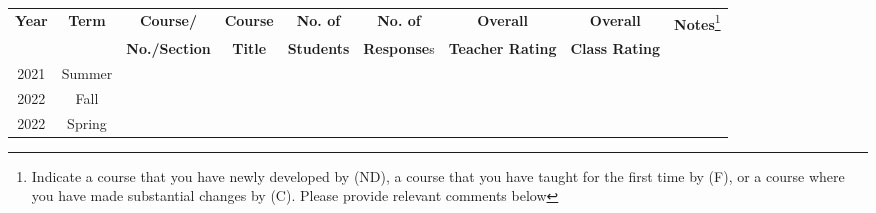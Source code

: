 \documentclass[11pt]{article}
\begin{document}
\begin{minipage}{\textwidth}
  \footnotesize
  \begin{tabular}{ccccccccc}
    \toprule
    \textbf{Year}&\textbf{Term}&\textbf{Course/}&\textbf{Course}&\textbf{No. of}&\textbf{No. of}&\textbf{Overall}&\textbf{Overall}&\textbf{Notes}\footnote{Indicate a course that you have newly developed by (ND), a course that you have taught for the first time by (F), or a course where you have made substantial changes by (C).  Please provide relevant comments below}\\
    &&\textbf{No./Section}&\textbf{Title}&\textbf{Students}&\textbf{Response}s& \textbf{Teacher Rating}& \textbf{Class Rating}&\\
    \midrule
    2021& Summer & & & & & & &\\
    \midrule
    2022& Fall & & & & & & &\\
    \bottomrule
    2022& Spring & & & & & & &\\
    \bottomrule
  \end{tabular}
\end{minipage}


% 
\end{document}
